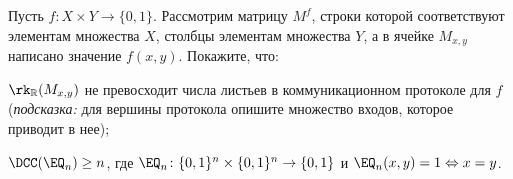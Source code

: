 Пусть $f\colon X \times Y \to \{0, 1\}$. Рассмотрим матрицу $M^f$, строки которой соответствуют элементам
множества $X$, столбцы элементам множества $Y$, а в ячейке $M_{x, y}$ написано значение $f(x,
y)$. Покажите, что:
\begin{enumcyr}
    \item $\rk_{\mathbb{R}}(M_{x, y})$ не превосходит числа листьев в коммуникационном протоколе для $f$
        (\textit{подсказка:} для вершины протокола опишите множество входов, которое приводит в нее);
    \item $\DCC(\EQ_{n}) \ge n$, где $\EQ_{n}\colon \{0, 1\}^n \times \{0, 1\}^n \to \{0, 1\}$ и $\EQ_n(x, y) = 1
        \Leftrightarrow x = y$. 
\end{enumcyr}